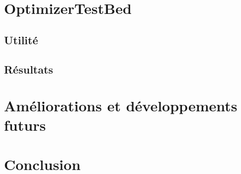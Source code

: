 \documentclass[a4paper, 11pt]{report}
\begin{document}
\section{OptimizerTestBed}

\subsection{Utilité}

\subsection{Résultats}

\section{Améliorations et développements futurs}

\section{Conclusion}

\newpage
\nocite{*}


\end{document}
